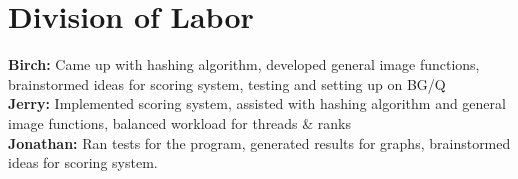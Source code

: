 \documentclass[10pt, journal]{vgtc}                %
\begin{document}


\section{Division of Labor}
\textbf{Birch:} Came up with hashing algorithm, developed general image functions, brainstormed ideas for scoring system, testing and setting up on BG/Q\\
\textbf{Jerry:} Implemented scoring system, assisted with hashing algorithm and general image functions, balanced workload for threads \& ranks\\
\textbf{Jonathan:} Ran tests for the program, generated results for graphs, brainstormed ideas for scoring system.





\nocite{*}

\end{document}
